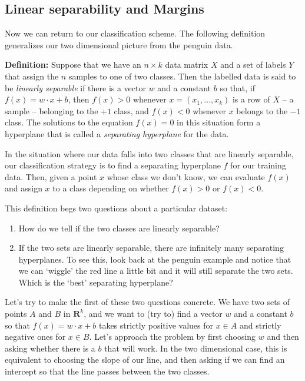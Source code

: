 \documentclass[
  11pt,
  letterpaper,
]{scrbook}
\providecommand{\tightlist}{%
  \setlength{\itemsep}{0pt}\setlength{\parskip}{0pt}}\usepackage{longtable,booktabs,array}
\theoremstyle{plain}
\theoremstyle{plain}
\theoremstyle{remark}
\begin{document}
\hypertarget{sec-linearseparable}{%
\subsection{Linear separability and Margins}\label{sec-linearseparable}}

Now we can return to our classification scheme. The following definition
generalizes our two dimensional picture from the penguin data.

\textbf{Definition:} Suppose that we have an \(n\times k\) data matrix
\(X\) and a set of labels \(Y\) that assign the \(n\) samples to one of
two classes. Then the labelled data is said to be \emph{linearly
separable} if there is a vector \(w\) and a constant \(b\) so that, if
\(f(x)=w\cdot x+b\), then \(f(x)>0\) whenever \(x=(x_1,\ldots, x_k)\) is
a row of \(X\) -- a sample -- belonging to the \(+1\) class, and
\(f(x)<0\) whenever \(x\) belongs to the \(-1\) class. The solutions to
the equation \(f(x)=0\) in this situation form a hyperplane that is
called a \emph{separating hyperplane} for the data.

In the situation where our data falls into two classes that are linearly
separable, our classification strategy is to find a separating
hyperplane \(f\) for our training data. Then, given a point \(x\) whose
class we don't know, we can evaluate \(f(x)\) and assign \(x\) to a
class depending on whether \(f(x)>0\) or \(f(x)<0\).

This definition begs two questions about a particular dataset:

\begin{enumerate}
\def\labelenumi{\arabic{enumi}.}
\tightlist
\item
  How do we tell if the two classes are linearly separable?
\item
  If the two sets are linearly separable, there are infinitely many
  separating hyperplanes. To see this, look back at the penguin example
  and notice that we can `wiggle' the red line a little bit and it will
  still separate the two sets. Which is the `best' separating
  hyperplane?
\end{enumerate}

Let's try to make the first of these two questions concrete. We have two
sets of points \(A\) and \(B\) in \(\mathbf{R}^{k}\), and we want to
(try to) find a vector \(w\) and a constant \(b\) so that
\(f(x)=w\cdot x+b\) takes strictly positive values for \(x\in A\) and
strictly negative ones for \(x\in B\). Let's approach the problem by
first choosing \(w\) and then asking whether there is a \(b\) that will
work. In the two dimensional case, this is equivalent to choosing the
slope of our line, and then asking if we can find an intercept so that
the line passes between the two classes.
\end{document}
